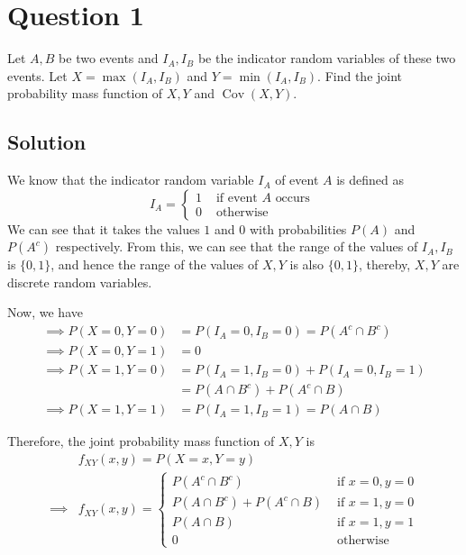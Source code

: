 \section*{Question 1}

Let \( A, B \) be two events and \( I_{A}, I_{B} \) be the indicator random variables of these two events.
Let \( X=\max \left(I_{A}, I_{B}\right) \) and \( Y=\min \left(I_{A}, I_{B}\right) \).
Find the joint probability mass function of \( X, Y \) and \( \operatorname{Cov}(X, Y) \).

\subsection*{Solution}

We know that the indicator random variable \( I_{A} \) of event \( A \) is defined as
\begin{equation*}
    I_{A}=\begin{cases}
        1 & \text { if event } A \text { occurs } \\
        0 & \text { otherwise }
    \end{cases}
\end{equation*}
We can see that it takes the values \( 1 \) and \( 0 \) with probabilities \( P(A) \) and \( P(A^{c}) \) respectively.
From this, we can see that the range of the values of \( I_{A}, I_{B} \) is \( \{0, 1\} \), and hence the range of the values of \( X, Y \) is also \( \{0, 1\} \), thereby, \( X, Y \) are discrete random variables.

Now, we have
\begin{align*}
    \implies
    P(X=0, Y=0)
     & =
    P(I_{A}=0, I_{B}=0)
    =
    P(A^{c} \cap B^{c})
    \\
    \implies
    P(X=0, Y=1)
     & =
    0
    \\
    \implies
    P(X=1, Y=0)
     & =
    P(I_{A}=1, I_{B}=0) + P(I_{A}=0, I_{B}=1)
    \\ & =
    P(A \cap B^{c}) + P(A^{c} \cap B)
    \\
    \implies
    P(X=1, Y=1)
     & =
    P(I_{A}=1, I_{B}=1)
    =
    P(A \cap B)
\end{align*}

Therefore, the joint probability mass function of \( X, Y \) is
\begin{align*}
     &
    f_{XY}(x, y)
    =
    P(X=x, Y=y)
    \\
    \implies
     &
    \boxed{
        f_{XY}(x, y)
        =
        \begin{cases}
            P(A^{c} \cap B^{c})
             &
            \text { if } x=0, y=0
            \\
            P(A \cap B^{c}) + P(A^{c} \cap B)
             & \text { if } x=1, y=0
            \\
            P(A \cap B)
             & \text { if } x=1, y=1
            \\
            0
             & \text { otherwise }
        \end{cases}
    }
\end{align*}

